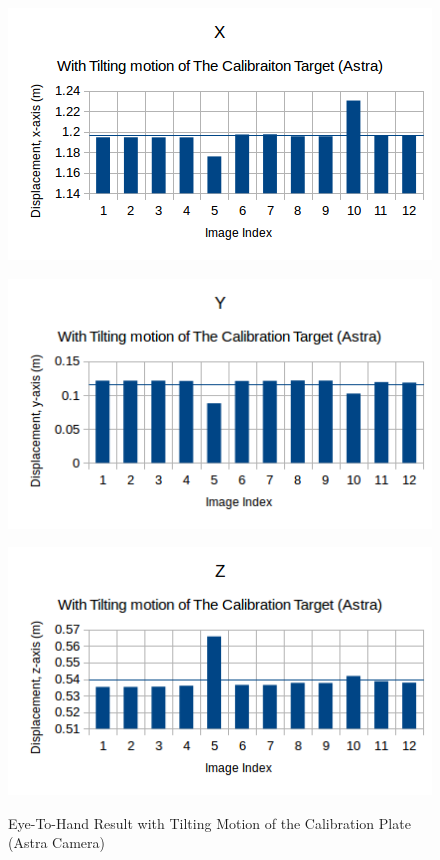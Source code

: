 \begin{figure}[htp]
\begin{center}
{
  \includegraphics[clip,width=0.5\columnwidth]{figures/astra/tiltingorientation_astra_x.png}%
}
\end{center}
\begin{center}
{
  \includegraphics[clip,width=0.5\columnwidth]{figures/astra/tiltingorientation_astra_y.png}%
}
\end{center}

\begin{center}
{
  \includegraphics[clip,width=0.5\columnwidth]{figures/astra/tiltingorientation_astra_z.png}%
}
\end{center}
\caption{Eye-To-Hand Result with Tilting Motion of the Calibration Plate (Astra Camera)}
\end{figure}




